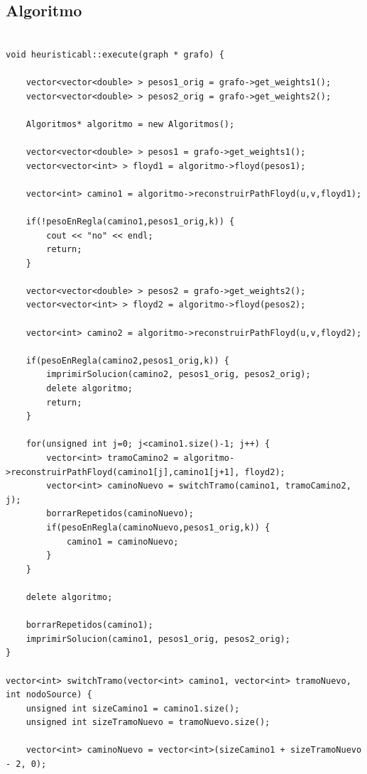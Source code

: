 \subsection{Algoritmo}
\begin{lstlisting}

void heuristicabl::execute(graph * grafo) {

	vector<vector<double> > pesos1_orig = grafo->get_weights1();
	vector<vector<double> > pesos2_orig = grafo->get_weights2();
	
	Algoritmos* algoritmo = new Algoritmos();

	vector<vector<double> > pesos1 = grafo->get_weights1();
	vector<vector<int> > floyd1 = algoritmo->floyd(pesos1);

	vector<int> camino1 = algoritmo->reconstruirPathFloyd(u,v,floyd1);
	
	if(!pesoEnRegla(camino1,pesos1_orig,k)) {
		cout << "no" << endl;
		return;
	}

	vector<vector<double> > pesos2 = grafo->get_weights2();
	vector<vector<int> > floyd2 = algoritmo->floyd(pesos2);
	
	vector<int> camino2 = algoritmo->reconstruirPathFloyd(u,v,floyd2);

	if(pesoEnRegla(camino2,pesos1_orig,k)) {
		imprimirSolucion(camino2, pesos1_orig, pesos2_orig);
		delete algoritmo;
		return;
	}
	
	for(unsigned int j=0; j<camino1.size()-1; j++) {
		vector<int> tramoCamino2 = algoritmo->reconstruirPathFloyd(camino1[j],camino1[j+1], floyd2);
		vector<int> caminoNuevo = switchTramo(camino1, tramoCamino2, j);
		borrarRepetidos(caminoNuevo);
		if(pesoEnRegla(caminoNuevo,pesos1_orig,k)) {
			camino1 = caminoNuevo;
		}
	}
	
	delete algoritmo;

	borrarRepetidos(camino1);
	imprimirSolucion(camino1, pesos1_orig, pesos2_orig);
}

vector<int> switchTramo(vector<int> camino1, vector<int> tramoNuevo, int nodoSource) {
	unsigned int sizeCamino1 = camino1.size();
	unsigned int sizeTramoNuevo = tramoNuevo.size();

	vector<int> caminoNuevo = vector<int>(sizeCamino1 + sizeTramoNuevo - 2, 0);


\end{lstlisting}
